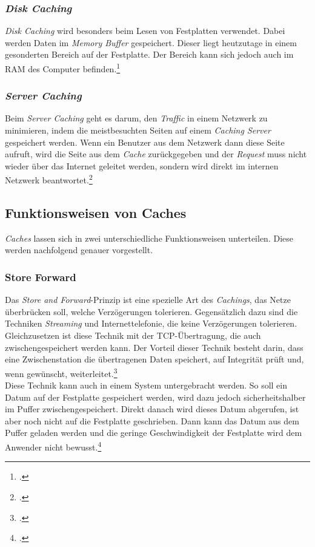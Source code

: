 \subsubsection*{\textit{Disk Caching}}
\textit{Disk Caching} wird besonders beim Lesen von Festplatten verwendet. Dabei werden Daten im \textit{Memory Buffer} gespeichert. Dieser liegt heutzutage in einem gesonderten Bereich auf der Festplatte. Der Bereich kann sich jedoch auch im \ac{RAM} des Computer befinden.\footcite{Cache-Techtarget-DiskCache}
\subsubsection*{\textit{Server Caching}}
Beim \textit{Server Caching} geht es darum, den \textit{Traffic} in einem Netzwerk zu minimieren, indem die meistbesuchten Seiten auf einem \textit{Caching Server} gespeichert werden. Wenn ein Benutzer aus dem Netzwerk dann diese Seite aufruft, wird die Seite aus dem \textit{Cache} zurückgegeben und der \textit{Request} muss nicht wieder über das Internet geleitet werden, sondern wird direkt im internen Netzwerk beantwortet.\footcite{Cache-ProxyCache}
\subsection{Funktionsweisen von Caches}
\label{ssec:cache-funktionsweisen}
\textit{Caches} lassen sich in zwei unterschiedliche Funktionsweisen unterteilen. Diese werden nachfolgend genauer vorgestellt.
\subsubsection*{Store Forward}
\label{sssec:cache-store-forward}
Das \textit{Store and Forward}-Prinzip ist eine spezielle Art des \textit{Cachings}, das Netze überbrücken soll, welche Verzögerungen tolerieren. Gegensätzlich dazu sind die Techniken \textit{Streaming} und Internettelefonie, die keine Verzögerungen tolerieren. Gleichzusetzen ist diese Technik mit der \ac{TCP}-Übertragung, die auch zwischengespeichert werden kann. Der Vorteil dieser Technik besteht darin, dass eine Zwischenstation die übertragenen Daten speichert, auf Integrität prüft und, wenn gewünscht, weiterleitet.\footcite{Cache-StoreForward}\\
Diese Technik kann auch in einem System untergebracht werden. So soll ein Datum auf der Festplatte gespeichert werden, wird dazu jedoch sicherheitshalber im Puffer zwischengespeichert. Direkt danach wird dieses Datum abgerufen, ist aber noch nicht auf die Festplatte geschrieben. Dann kann das Datum aus dem Puffer geladen werden und die geringe Geschwindigkeit der Festplatte wird dem Anwender nicht bewusst.\footcite{Cache-StoreForwardSOA}
